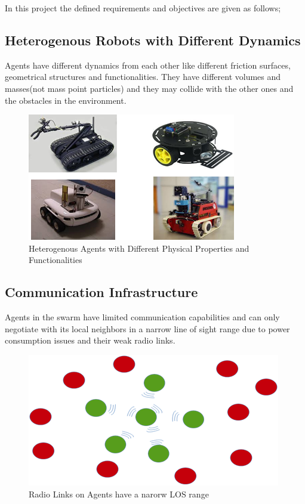 In this project the defined requirements and objectives are given as follows;

\subsection{Heterogenous Robots with Different Dynamics}


Agents have different dynamics from each other like different friction surfaces, geometrical structures and functionalities. They have different volumes and masses(not mass point particles) and they may collide with the other ones and the obstacles in the environment. 


	\begin{figure}[H]
		\caption{Heterogenous Agents with Different Physical Properties and Functionalities}
		\centering
		\includegraphics[scale = 1]{heterogenous}
	\end{figure} 
	
	

\subsection{Communication Infrastructure}

Agents in the swarm have limited communication capabilities and can only negotiate with its local neighbors in a narrow line of sight range due to power consumption issues and their weak radio links.

\begin{figure}[H]
	\caption{Radio Links on Agents have a narorw LOS range}
	\centering
	\includegraphics[scale = 1]{narrow_los}
\end{figure} 



